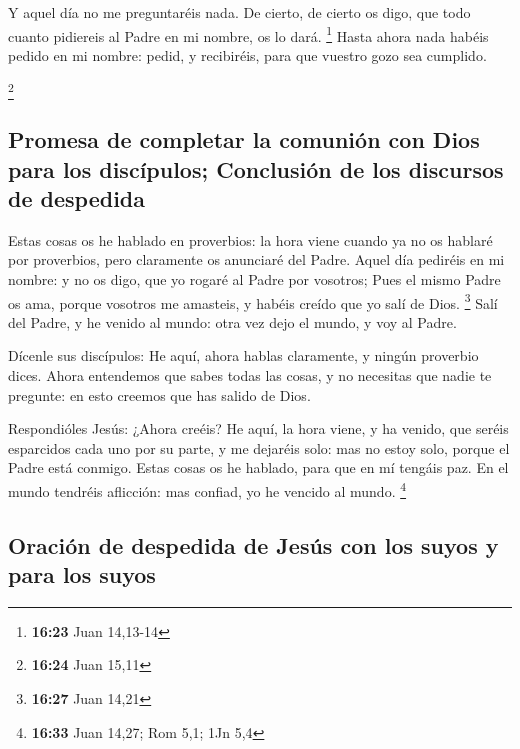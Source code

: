  Y aquel día no me preguntaréis nada. De cierto, de
cierto os digo, que todo cuanto pidiereis al Padre en mi nombre, os lo
dará. \footnote{\textbf{16:23} Juan 14,13-14}  Hasta
ahora nada habéis pedido en mi nombre: pedid, y recibiréis, para que
vuestro gozo sea cumplido.

\footnote{\textbf{16:24} Juan 15,11}

\hypertarget{promesa-de-completar-la-comuniuxf3n-con-dios-para-los-discuxedpulos-conclusiuxf3n-de-los-discursos-de-despedida}{%
\subsection{Promesa de completar la comunión con Dios para los
discípulos; Conclusión de los discursos de
despedida}\label{promesa-de-completar-la-comuniuxf3n-con-dios-para-los-discuxedpulos-conclusiuxf3n-de-los-discursos-de-despedida}}

 Estas cosas os he hablado en proverbios: la hora viene
cuando ya no os hablaré por proverbios, pero claramente os anunciaré del
Padre.  Aquel día pediréis en mi nombre: y no os digo,
que yo rogaré al Padre por vosotros;  Pues el mismo Padre
os ama, porque vosotros me amasteis, y habéis creído que yo salí de
Dios. \footnote{\textbf{16:27} Juan 14,21}  Salí del
Padre, y he venido al mundo: otra vez dejo el mundo, y voy al Padre.

 Dícenle sus discípulos: He aquí, ahora hablas
claramente, y ningún proverbio dices.  Ahora entendemos
que sabes todas las cosas, y no necesitas que nadie te pregunte: en esto
creemos que has salido de Dios.

 Respondióles Jesús: ¿Ahora creéis?  He
aquí, la hora viene, y ha venido, que seréis esparcidos cada uno por su
parte, y me dejaréis solo: mas no estoy solo, porque el Padre está
conmigo.  Estas cosas os he hablado, para que en mí
tengáis paz. En el mundo tendréis aflicción: mas confiad, yo he vencido
al mundo. \footnote{\textbf{16:33} Juan 14,27; Rom 5,1; 1Jn 5,4}

\hypertarget{oraciuxf3n-de-despedida-de-jesuxfas-con-los-suyos-y-para-los-suyos}{%
\subsection{Oración de despedida de Jesús con los suyos y para los
suyos}\label{oraciuxf3n-de-despedida-de-jesuxfas-con-los-suyos-y-para-los-suyos}}

